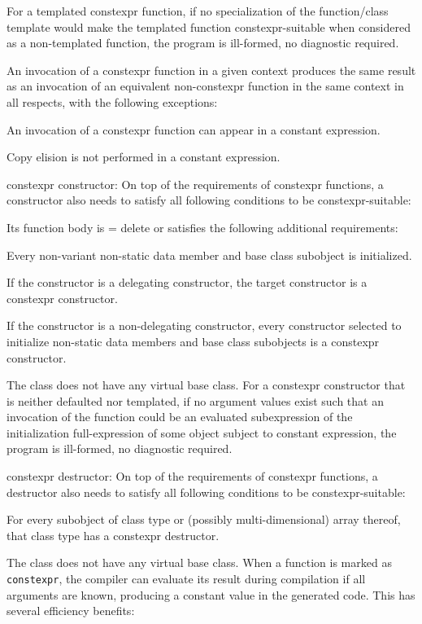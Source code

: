 \documentclass[a4paper,12pt]{article}
\begin{document}
\item For a templated constexpr function, if no specialization of the function/class template would make the templated function constexpr-suitable when considered as a non-templated function, the program is ill-formed, no diagnostic required.
\item An invocation of a constexpr function in a given context produces the same result as an invocation of an equivalent non-constexpr function in the same context in all respects, with the following exceptions:
\bit
\item An invocation of a constexpr function can appear in a constant expression.
\item Copy elision is not performed in a constant expression.
\eit
\item constexpr constructor: On top of the requirements of constexpr functions, a constructor also needs to satisfy all following conditions to be constexpr-suitable:
\bit
\item Its function body is = delete or satisfies the following additional requirements:
\bit
\item Every non-variant non-static data member and base class subobject is initialized.
\item If the constructor is a delegating constructor, the target constructor is a constexpr constructor.
\item If the constructor is a non-delegating constructor, every constructor selected to initialize non-static data members and base class subobjects is a constexpr constructor.
\eit
\item The class does not have any virtual base class.
\eit
For a constexpr constructor that is neither defaulted nor templated, if no argument values exist such that an invocation of the function could be an evaluated subexpression of the initialization full-expression of some object subject to constant expression, the program is ill-formed, no diagnostic required.
\item constexpr destructor: On top of the requirements of constexpr functions, a destructor also needs to satisfy all following conditions to be constexpr-suitable:
\bit
\item For every subobject of class type or (possibly multi-dimensional) array thereof, that class type has a constexpr destructor.
\item The class does not have any virtual base class.
\eit
\eit
When a function is marked as \texttt{constexpr}, the compiler can evaluate its result during compilation if all arguments are known, producing a constant value in the generated code. This has several efficiency benefits:
\end{document}
